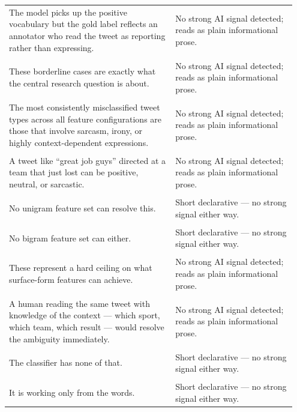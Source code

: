 \documentclass[11pt]{article}
\begin{document}
\begin{longtable}{|p{0.55\linewidth}|p{0.40\linewidth}|}
\hline
\rule{0pt}{3.5cm} & \\
\hline
The model picks up the positive vocabulary but the gold label reflects an annotator who read the tweet as reporting rather than expressing. & No strong AI signal detected; reads as plain informational prose. \\[2pt]
\hline
\rule{0pt}{3.5cm} & \\
\hline
These borderline cases are exactly what the central research question is about. & No strong AI signal detected; reads as plain informational prose. \\[2pt]
\hline
\rule{0pt}{3.5cm} & \\
\hline
The most consistently misclassified tweet types across all feature configurations are those that involve sarcasm, irony, or highly context-dependent expressions. & No strong AI signal detected; reads as plain informational prose. \\[2pt]
\hline
\rule{0pt}{3.5cm} & \\
\hline
A tweet like ``great job guys'' directed at a team that just lost can be positive, neutral, or sarcastic. & No strong AI signal detected; reads as plain informational prose. \\[2pt]
\hline
\rule{0pt}{3.5cm} & \\
\hline
No unigram feature set can resolve this. & Short declarative --- no strong signal either way. \\[2pt]
\hline
\rule{0pt}{3.5cm} & \\
\hline
No bigram feature set can either. & Short declarative --- no strong signal either way. \\[2pt]
\hline
\rule{0pt}{3.5cm} & \\
\hline
These represent a hard ceiling on what surface-form features can achieve. & No strong AI signal detected; reads as plain informational prose. \\[2pt]
\hline
\rule{0pt}{3.5cm} & \\
\hline
A human reading the same tweet with knowledge of the context --- which sport, which team, which result --- would resolve the ambiguity immediately. & No strong AI signal detected; reads as plain informational prose. \\[2pt]
\hline
\rule{0pt}{3.5cm} & \\
\hline
The classifier has none of that. & Short declarative --- no strong signal either way. \\[2pt]
\hline
\rule{0pt}{3.5cm} & \\
\hline
It is working only from the words. & Short declarative --- no strong signal either way. \\[2pt]

\end{longtable}
\end{document}
